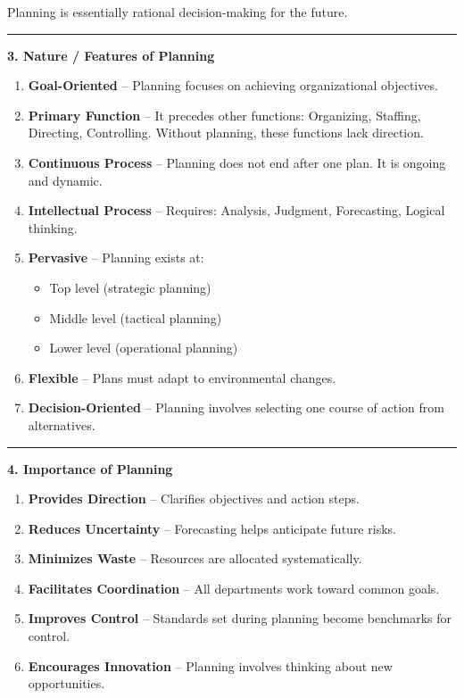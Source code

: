 \documentclass[10pt,a4paper]{article}
\newcommand{\separator}{\vspace{0.4em}\noindent\rule{\linewidth}{0.6pt}\vspace{0.4em}}
\begin{document}
Planning is essentially rational decision-making for the future.

\separator

\textbf{3. Nature / Features of Planning}

\begin{enumerate}
  \item \textbf{Goal-Oriented} -- Planning focuses on achieving organizational objectives.
  \item \textbf{Primary Function} -- It precedes other functions: Organizing, Staffing, Directing, Controlling. Without planning, these functions lack direction.
  \item \textbf{Continuous Process} -- Planning does not end after one plan. It is ongoing and dynamic.
  \item \textbf{Intellectual Process} -- Requires: Analysis, Judgment, Forecasting, Logical thinking.
  \item \textbf{Pervasive} -- Planning exists at:
    \begin{itemize}
      \item Top level (strategic planning)
      \item Middle level (tactical planning)
      \item Lower level (operational planning)
    \end{itemize}
  \item \textbf{Flexible} -- Plans must adapt to environmental changes.
  \item \textbf{Decision-Oriented} -- Planning involves selecting one course of action from alternatives.
\end{enumerate}

\separator

\textbf{4. Importance of Planning}

\begin{enumerate}
  \item \textbf{Provides Direction} -- Clarifies objectives and action steps.
  \item \textbf{Reduces Uncertainty} -- Forecasting helps anticipate future risks.
  \item \textbf{Minimizes Waste} -- Resources are allocated systematically.
  \item \textbf{Facilitates Coordination} -- All departments work toward common goals.
  \item \textbf{Improves Control} -- Standards set during planning become benchmarks for control.
  \item \textbf{Encourages Innovation} -- Planning involves thinking about new opportunities.
\end{enumerate}
\end{document}
